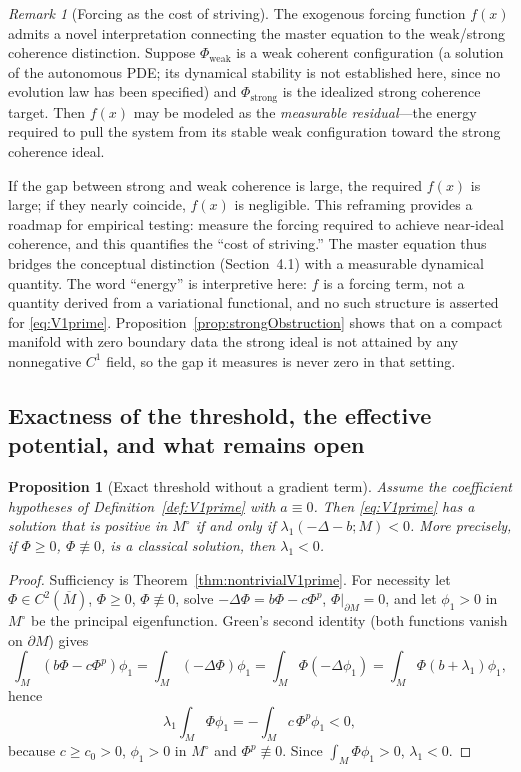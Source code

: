 \documentclass[11pt]{article}
\theoremstyle{plain}
\newtheorem{proposition}[theorem]{Proposition}
\theoremstyle{definition}
\theoremstyle{remark}
\newtheorem{remark}[theorem]{Remark}
\begin{document}
\begin{remark}[Forcing as the cost of striving]
The exogenous forcing function \(f(x)\) admits a novel interpretation connecting the master equation to the weak/strong coherence distinction. Suppose \(\Phi_{\mathrm{weak}}\) is a weak coherent configuration (a solution of the autonomous PDE; its dynamical stability is not established here, since no evolution law has been specified) and \(\Phi_{\mathrm{strong}}\) is the idealized strong coherence target. Then \(f(x)\) may be modeled as the \emph{measurable residual}---the energy required to pull the system from its stable weak configuration toward the strong coherence ideal.

If the gap between strong and weak coherence is large, the required \(f(x)\) is large; if they nearly coincide, \(f(x)\) is negligible. This reframing provides a roadmap for empirical testing: measure the forcing required to achieve near-ideal coherence, and this quantifies the ``cost of striving.'' The master equation thus bridges the conceptual distinction (Section~4.1) with a measurable dynamical quantity. The word ``energy'' is interpretive here: \(f\) is a forcing term, not a quantity derived from a variational functional, and no such structure is asserted for \eqref{eq:V1prime}. Proposition~\ref{prop:strongObstruction} shows that on a compact manifold with zero boundary data the strong ideal is not attained by any nonnegative \(C^1\) field, so the gap it measures is never zero in that setting.
\end{remark}

\subsection{Exactness of the threshold, the effective potential, and what remains open}\label{sec:exactness}

\begin{proposition}[Exact threshold without a gradient term]\label{prop:exactThreshold}
Assume the coefficient hypotheses of Definition~\ref{def:V1prime} with \(a\equiv 0\). Then \eqref{eq:V1prime} has a solution that is positive in \(M^\circ\) if and only if \(\lambda_1(-\Delta-b;M)<0\). More precisely, if \(\Phi\ge 0\), \(\Phi\not\equiv 0\), is a classical solution, then \(\lambda_1<0\).
\end{proposition}
\begin{proof}
Sufficiency is Theorem~\ref{thm:nontrivialV1prime}. For necessity let \(\Phi\in C^2(\overline M)\), \(\Phi\ge 0\), \(\Phi\not\equiv 0\), solve \(-\Delta\Phi=b\Phi-c\Phi^p\), \(\Phi|_{\partial M}=0\), and let \(\phi_1>0\) in \(M^\circ\) be the principal eigenfunction. Green's second identity (both functions vanish on \(\partial M\)) gives
\[
\int_M(b\Phi-c\Phi^p)\phi_1=\int_M(-\Delta\Phi)\phi_1=\int_M\Phi(-\Delta\phi_1)=\int_M\Phi(b+\lambda_1)\phi_1,
\]
hence
\[
\lambda_1\int_M\Phi\phi_1=-\int_M c\,\Phi^p\phi_1<0 ,
\]
because \(c\ge c_0>0\), \(\phi_1>0\) in \(M^\circ\) and \(\Phi^p\not\equiv 0\). Since \(\int_M\Phi\phi_1>0\), \(\lambda_1<0\).
\end{proof}
\end{document}
